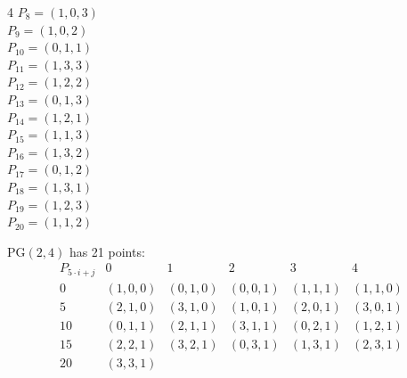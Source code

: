 {\begin{multicols}{4}
$P_{8}=( 1, 0, 3 )$\\
$P_{9}=( 1, 0, 2 )$\\
$P_{10}=( 0, 1, 1 )$\\
$P_{11}=( 1, 3, 3 )$\\
$P_{12}=( 1, 2, 2 )$\\
$P_{13}=( 0, 1, 3 )$\\
$P_{14}=( 1, 2, 1 )$\\
$P_{15}=( 1, 1, 3 )$\\
$P_{16}=( 1, 3, 2 )$\\
$P_{17}=( 0, 1, 2 )$\\
$P_{18}=( 1, 3, 1 )$\\
$P_{19}=( 1, 2, 3 )$\\
$P_{20}=( 1, 1, 2 )$\\
\end{multicols}

PG$(2, 4)$ has 21 points:\\
$$
\begin{array}{r|*{5}{r}}
P_{5\cdot i+j} & 0 & 1 & 2 & 3 & 4\\
\hline
0 & ( 1, 0, 0 ) & ( 0, 1, 0 ) & ( 0, 0, 1 ) & ( 1, 1, 1 ) & ( 1, 1, 0 )\\
5 & ( 2, 1, 0 ) & ( 3, 1, 0 ) & ( 1, 0, 1 ) & ( 2, 0, 1 ) & ( 3, 0, 1 )\\
10 & ( 0, 1, 1 ) & ( 2, 1, 1 ) & ( 3, 1, 1 ) & ( 0, 2, 1 ) & ( 1, 2, 1 )\\
15 & ( 2, 2, 1 ) & ( 3, 2, 1 ) & ( 0, 3, 1 ) & ( 1, 3, 1 ) & ( 2, 3, 1 )\\
20 & ( 3, 3, 1 ) &  &  &  & \\
\end{array}
$$

}
